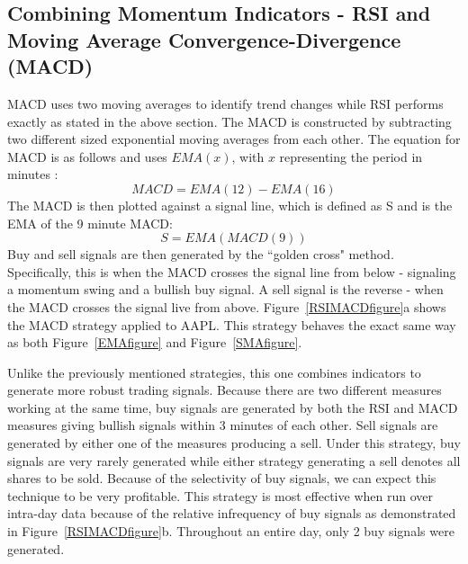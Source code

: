 \documentclass[letterpaper,11pt]{article}
\begin{document}
\FloatBarrier

\subsection{Combining Momentum Indicators - RSI and Moving Average Convergence-Divergence (MACD)}

MACD uses two moving averages to identify trend changes while RSI performs exactly as stated in the above section. The MACD is constructed by subtracting two different sized exponential moving averages from each other. The equation for MACD is as follows and uses $EMA(x)$, with $x$ representing the period in minutes \cite{Chong2014}: \[ MACD = EMA(12) - EMA(16)\] The MACD is then plotted against a signal line, which is defined as S and is the EMA of the 9 minute MACD: \[ S = EMA(MACD(9)) \] Buy and sell signals are then generated by the ``golden cross" method. Specifically, this is when the MACD crosses the signal line from below - signaling a momentum swing and a bullish buy signal. A sell signal is the reverse - when the MACD crosses the signal live from above. Figure~\ref{RSIMACDfigure}a shows the MACD strategy applied to AAPL. This strategy behaves the exact same way as both Figure~\ref{EMAfigure} and Figure~\ref{SMAfigure}.

Unlike the previously mentioned strategies, this one combines indicators to generate more robust trading signals. Because there are two different measures working at the same time, buy signals are generated by both the RSI and MACD measures giving bullish signals within 3 minutes of each other. Sell signals are generated by either one of the measures producing a sell. Under this strategy, buy signals are very rarely generated while either strategy generating a sell denotes all shares to be sold. Because of the selectivity of buy signals, we can expect this technique to be very profitable. This strategy is most effective when run over intra-day data because of the relative infrequency of buy signals as demonstrated in Figure~\ref{RSIMACDfigure}b. Throughout an entire day, only 2 buy signals were generated. 
\end{document}
